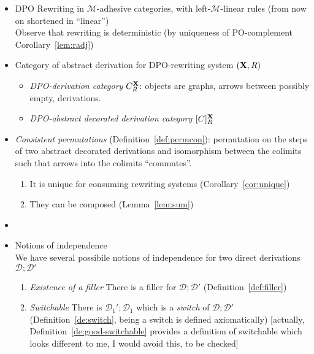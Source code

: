 \documentclass[a4paper,UKenglish,cleveref,pdftex, thm-restate,numberwithinsect]{lipics}
\newcommand{\dpo}{\textsc{dpo}}
\def\R{\mathsf{R}}
\def\X{\textbf {\textup{X}}}
\newcommand{\dder}[1]{\mathscr{#1}}
\def\dpo{\mathsf{C}^{\X}_R}
\def\dpi{[\mathsf{C}]^{\X}_R}
\begin{document}
\begin{itemize}
\item DPO Rewriting in $\mathcal{M}$-adhesive categories, with left-$\mathcal{M}$-linear rules (from now on shortened in ``linear'')\\
  Observe that rewriting is deterministic (by uniqueness of
  PO-complement Corollary~\ref{lem:radj})
  
\item Category of abstract derivation for DPO-rewriting system $(\X, \R)$
  \begin{itemize}
  \item \emph{DPO-derivation category} $\dpo$: objects are graphs, arrows between possibly empty, derivations.
  \item \emph{DPO-abstract decorated derivation category} $\dpi$
  \end{itemize}



\item \emph{Consistent permutations} (Definition~\ref{def:permcon}):
  permutation on the steps of two abstract decorated derivations and isomorphism between the colimits such
  that arrows into the colimits ``commutes''.
  \begin{enumerate}
  \item It is unique for consuming rewriting systems
    (Corollary~\ref{cor:unique})
  \item They can be composed (Lemma~\ref{lem:sum})
  \end{enumerate}
\item 

  
\item Notions of independence\\
  We have several possibile notions of independence for two direct
  derivations $\dder{D} ; \dder{D'}$
  \begin{enumerate}
    
  \item \emph{Existence of a filler}
    There is a filler for $\dder{D} ; \dder{D'}$
    (Definition~\ref{def:filler})

  \item \emph{Switchable}
    There is $\dder{D}_1' ; \dder{D}_1$ which is a \emph{switch}
    of $\dder{D} ; \dder{D'}$ (Definition~\ref{de:switch}, being a
    switch is defined axiomatically) [actually, Definition~\ref{de:good-switchable} provides a definition of switchable which looks different to me, I would avoid this, to be checked] 


\end{enumerate}
\end{itemize}
\end{document}
